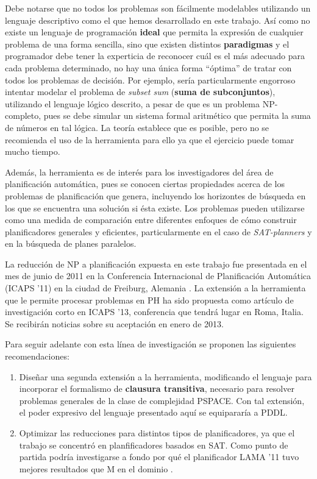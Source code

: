 Debe notarse que no todos los problemas son fácilmente modelables utilizando un
lenguaje descriptivo como el que hemos desarrollado en este trabajo. Así como
no existe un lenguaje de programación \textbf{ideal} que permita la expresión
de cualquier problema de una forma sencilla, sino que existen distintos
\textbf{paradigmas} y el programador debe tener la experticia de reconocer
cuál es el más adecuado para cada problema determinado, no hay una única forma
``óptima'' de tratar con todos los problemas de decisión.
Por ejemplo, sería particularmente engorroso intentar
modelar el problema de \textit{subset sum} (\textbf{suma de subconjuntos}),
utilizando el lenguaje lógico descrito, a pesar de que es un problema
NP-completo, pues se debe simular un sistema formal
aritmético que permita la suma de números en tal lógica. La teoría establece
que es posible, pero no se recomienda el uso de la herramienta para ello ya que
el ejercicio puede tomar mucho tiempo.

Además, la herramienta es de interés para los investigadores del área de
planificación automática, pues se conocen ciertas propiedades acerca de los problemas 
de planificación que genera, incluyendo los horizontes de búsqueda en los que
se encuentra una solución si ésta existe. Los problemas pueden utilizarse como una
medida de comparación entre diferentes enfoques de cómo construir planificadores
generales y eficientes, particularmente en el caso de \textit{SAT-planners} y
en la búsqueda de planes paralelos.

La reducción de NP a planificación expuesta en este trabajo fue presentada en el mes de junio
de 2011 en la Conferencia Internacional de
Planificación Automática (ICAPS '11) en la ciudad de Freiburg, Alemania
\citep{porco:npreductions}.
La extensión a la herramienta que le permite procesar problemas en PH ha sido
propuesta como artículo de investigación corto en ICAPS '13, conferencia que
tendrá lugar en Roma, Italia. Se recibirán noticias sobre su aceptación en
enero de 2013.

Para seguir adelante con esta línea de investigación se proponen las siguientes
recomendaciones:

\begin{enumerate}[--]
\item Diseñar una segunda extensión a la herramienta, modificando el lenguaje
para incorporar el formalismo de \textbf{clausura transitiva}, necesario para
resolver problemas generales de la clase de complejidad PSPACE. Con tal
extensión, el poder expresivo del lenguaje presentado aquí se equipararía a
PDDL.
\item Optimizar las reducciones para distintos tipos de planificadores, ya que
el trabajo se concentró en planfificadores basados en SAT. Como punto de
partida podría investigarse a fondo por qué el planificador LAMA '11 tuvo
mejores resultados que M en el dominio \coCOL.
\end{enumerate}
